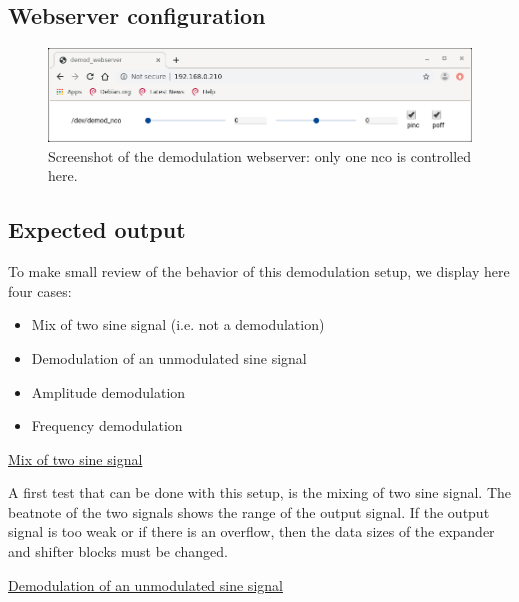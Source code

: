 \documentclass[12pt,oneside]{article}
\begin{document}
\subsection{Webserver configuration}
\vspace{-0.3cm}
\begin{figure}[h!tb]
	\begin{center}
		\vspace{0.5cm}
		\includegraphics[width=15cm,trim={0cm 0cm 0cm 0cm}, clip]{webserver/2020-01-08-082405_907x201_scrot.png}
		\caption{Screenshot of the demodulation webserver: only one nco is controlled here.}
		\label{fig:demod_webserver}
	\end{center}
\end{figure}
\vspace{-1cm}

\subsection{Expected output}

To make small review of the behavior of this demodulation setup, we display here four cases:

\begin{itemize}
	\setlength\itemsep{-0.2cm}
	\item Mix of two sine signal (i.e. not a demodulation)
	\item Demodulation of an unmodulated sine signal
	\item Amplitude demodulation
	\item Frequency demodulation
\end{itemize}

\underline{Mix of two sine signal}\newline

A first test that can be done with this setup, is the mixing of two sine signal. The beatnote of the two signals shows the range of the output signal. If the output signal is too weak or if there is an overflow, then the data sizes of the expander and shifter blocks must be changed.\newline


\underline{Demodulation of an unmodulated sine signal}\newline
\end{document}
